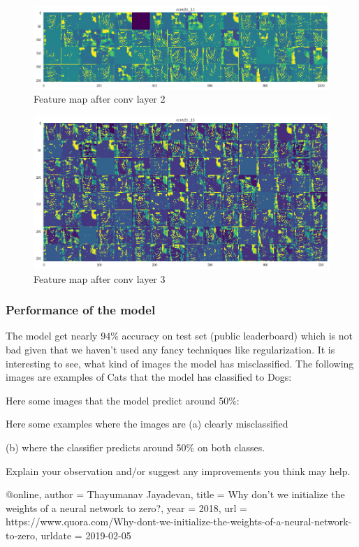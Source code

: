 \documentclass[a4paper]{article}
\begin{document}
\begin{figure}[h!]
	\centering
	\includegraphics[scale=.3]{fp2.png}
	\caption{Feature map after conv layer 2}
	\label{fig:fp2}
\end{figure}

\begin{figure}[h!]
	\centering
	\includegraphics[scale=.3]{fp3.png}
	\caption{Feature map after conv layer 3}
	\label{fig:fp3}
\end{figure}

\subsubsection{Performance of the model}
The model get nearly $94\%$ accuracy on test set (public leaderboard) which is not bad given that we haven't used any fancy techniques like regularization. It is interesting to see, what kind of images the model has misclassified. The following images are examples of Cats that the model has classified to Dogs:


Here some images that the model predict around 50\%:


Here some examples where the images are 
(a) clearly misclassified

(b) where the classifier predicts around 50\% on both classes.  

Explain your observation and/or suggest any improvements you think may help.

\begin{thebibliography}
@online{,
  author = {Thayumanav Jayadevan},
  title = {Why don't we initialize the weights of a neural network to zero?},
  year = 2018,
  url = {https://www.quora.com/Why-dont-we-initialize-the-weights-of-a-neural-network-to-zero},
  urldate = {2019-02-05}
}
\end{thebibliography}
\end{document}
